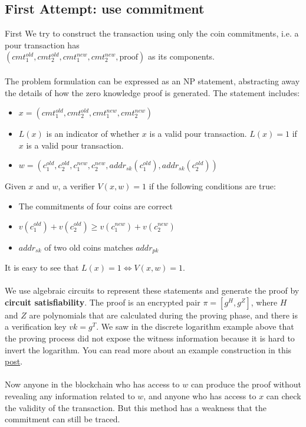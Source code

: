 \documentclass{report}
\begin{document}
\subsection{First Attempt: use commitment}
First We try to construct the transaction using only the coin commitments, i.e. a pour transaction has \\
$(cmt_1^{old} , cmt_2^{old}, cmt_1^{new}, cmt_2^{new} , \text{proof})$ as its components.\\\\
The problem formulation can be expressed as an NP statement, abstracting away the details of how the zero knowledge proof is generated. The statement includes:
\begin{itemize}
	\item $ x = (cmt_1^{old} , cmt_2^{old}, cmt_1^{new}, cmt_2^{new}) $
	\item $L(x)$ is an indicator of whether $x$ is a valid pour transaction. $L(x) = 1$ if $x$ is a valid pour transaction.
	\item $w = \left(c_1^{old}, c_2^{old}, c_1^{new}, c_2^{new}, addr_{sk}(c_1^{old}), addr_{sk}(c_2^{old})\right)$
\end{itemize}
Given $x$ and $w$, a verifier $V(x,w) = 1$ if the following conditions are true:
\begin{itemize}
	\item The commitments of four coins are correct
	\item $v(c_1^{old} )+v(c_2^{old} ) \ge v(c_1^{new} )+v(c_2^{new})$
	\item $addr_{sk}$ of two old coins matches $addr_{pk}$ 
\end{itemize}
It is easy to see that $L(x) = 1 \Leftrightarrow V(x,w) = 1$.\\\\
We use algebraic circuits to represent these statements and generate the proof by \textbf{circuit satisfiability}. The proof is an encrypted pair $\pi = [g^H, g^Z]$, where $H$ and $Z$ are polynomials that are calculated during the proving phase, and there is a verification key $vk = g^T$. We saw in the discrete logarithm example above that the proving process did not expose the witness information because it is hard to invert the logarithm. You can read more about an example construction in this \href{https://medium.com/@VitalikButerin/quadratic-arithmetic-programs-from-zero-to-hero-f6d558cea649}{post}.\\\\
Now anyone in the blockchain who has access to $w$ can produce the proof without revealing any information related to $w$, and anyone who has access to $x$ can check the validity of the transaction. But this method has a weakness that the commitment can still be traced.
\end{document}
